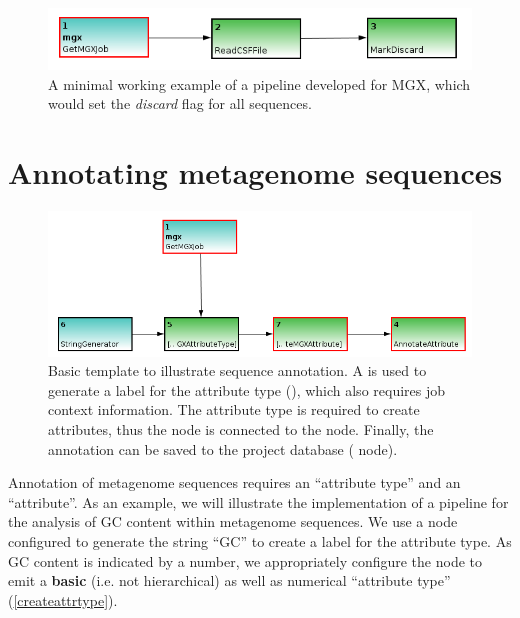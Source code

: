 \begin{figure}[H]
\centering
\includegraphics[width=.8\textwidth]{img/conveyor/simple}
\caption[Minimal example]{A minimal working example of a pipeline developed for MGX, which would set the \textit{discard} flag for all sequences.}
\label{simple}
\end{figure}


\section{Annotating metagenome sequences}

\begin{figure}[H]
\centering
\includegraphics[width=.85\textwidth]{img/conveyor/annotate_templ}
\caption[Metagenome annotation]{Basic template to illustrate sequence annotation. A  is
used to generate a label for the attribute type (), which also requires job context
information. The attribute type is required to create attributes, thus the node is connected to the  node. Finally, the annotation can be saved to the project database ( node).}
\label{annot}
\end{figure}

Annotation of metagenome sequences requires an ``attribute type'' and an ``attribute''. As an example, we will
illustrate the implementation of a pipeline for the analysis of GC content within metagenome sequences.
We use a  node configured to generate the string ``GC'' to create a label for the
attribute type. As GC content is indicated by a number, we appropriately configure the 
node to emit a \textbf{basic} (i.e. not hierarchical) as well as numerical ``attribute type'' (\ref{createattrtype}).

